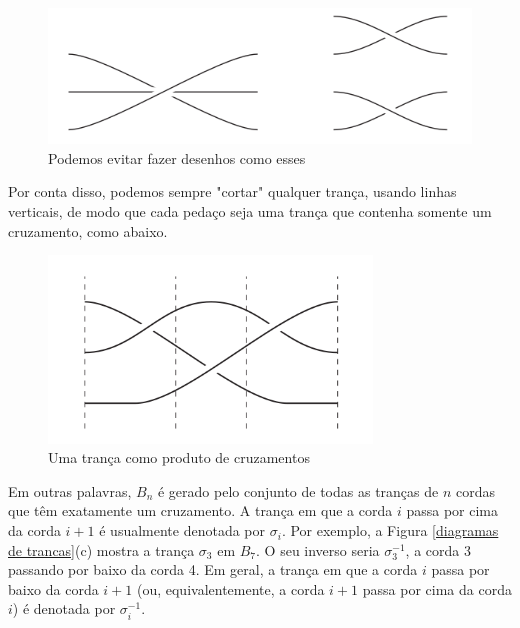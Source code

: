 	\begin{figure}[H]
		\captionsetup{justification=centering}
		\begin{center}
			\includegraphics[width=12cm]{Images/desenhos_evitaveis.png}
		\end{center}\caption{Podemos evitar fazer desenhos como esses}\label{diagramas indesejaveis}
	\end{figure}
	
	\par\vspace{0.3cm} Por conta disso, podemos sempre "cortar" qualquer trança, usando linhas verticais, de modo que cada pedaço seja uma trança que contenha somente um cruzamento, como abaixo.
	
	\begin{figure}[H]
		\captionsetup{justification=centering}
		\begin{center}
			\includegraphics[width=8.6cm]{Images/fig_18_8.png}
		\end{center}\caption{Uma trança como produto de cruzamentos}\label{cortar trancas}
	\end{figure} 
	
	\par\vspace{0.3cm} Em outras palavras, $B_n$ é gerado pelo conjunto de todas as tranças de $n$ cordas que têm exatamente um cruzamento. A trança em que a corda $i$ passa por cima da corda $i+1$ é usualmente denotada por $\sigma_i$. Por exemplo, a Figura \eqref{diagramas de trancas}(c) mostra a trança $\sigma_3$ em $B_7$. O seu inverso seria $\sigma_3^{-1}$, a corda 3 passando por baixo da corda 4. Em geral, a trança em que a corda $i$ passa por baixo da corda $i+1$ (ou, equivalentemente, a corda $i+1$ passa por cima da corda $i$) é denotada por $\sigma_i^{-1}$. 
	
